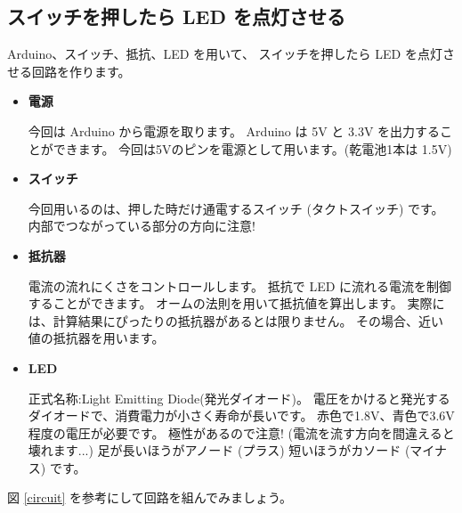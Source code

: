\documentclass[11pt,a4paper]{jarticle}
\begin{document}
\subsection*{スイッチを押したら LED を点灯させる}
Arduino、スイッチ、抵抗、LED を用いて、
スイッチを押したら LED を点灯させる回路を作ります。

\begin{itemize}
 \item \textbf{電源}
       
       今回は Arduino から電源を取ります。
       Arduino は 5V と 3.3V を出力することができます。
       今回は5Vのピンを電源として用います。(乾電池1本は 1.5V)

 \item \textbf{スイッチ}

       今回用いるのは、押した時だけ通電するスイッチ (タクトスイッチ) です。
       内部でつながっている部分の方向に注意!

 \item \textbf{抵抗器}

       電流の流れにくさをコントロールします。
       抵抗で LED に流れる電流を制御することができます。
       オームの法則を用いて抵抗値を算出します。
       実際には、計算結果にぴったりの抵抗器があるとは限りません。
       その場合、近い値の抵抗器を用います。

 \item \textbf{LED}

       正式名称:Light Emitting Diode(発光ダイオード)。
       電圧をかけると発光するダイオードで、消費電力が小さく寿命が長いです。
       赤色で1.8V、青色で3.6V程度の電圧が必要です。
       極性があるので注意! (電流を流す方向を間違えると壊れます...)
       足が長いほうがアノード (プラス) 短いほうがカソード (マイナス) です。
       
\end{itemize}

図 \ref{circuit} を参考にして回路を組んでみましょう。
\end{document}
